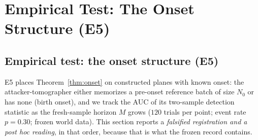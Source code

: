 \section{Empirical Test: The Onset Structure (E5)}
\label{sec:supp-e5}

\subsection{Empirical test: the onset structure (E5)}\label{sec:e5}

E5 places Theorem~\ref{thm:onset} on constructed planes with known onset:
the attacker-tomographer either memorizes a pre-onset reference batch of
size $N_0$ or has none (birth onset), and we track the AUC of its
two-sample detection statistic as the fresh-sample horizon $M$ grows ($120$
trials per point; event rate $p=0.30$; frozen world data). This section
reports a \emph{falsified registration and a post hoc reading}, in that
order, because that is what the frozen record contains.

